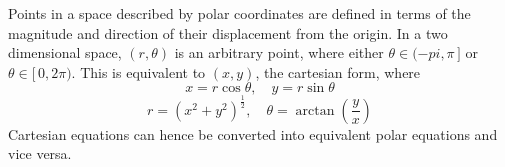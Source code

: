 \documentclass{article}
\begin{document}
\begin{multicols}{2}

    \begin{center}


    \end{center}

    \noindent Points in a space described by polar coordinates are defined in
    terms of the magnitude and direction of their displacement from the origin.
    In a two dimensional space, \(\left(r, \theta\right)\) is an arbitrary
    point, where either \(\theta \in (-pi, \pi\,]\) or \(\theta \in [\,0,
    2\pi)\). This is equivalent to \((x, y)\), the cartesian form, where \[x =
    r\cos\theta, \quad y = r\sin\theta\] \[r = \left(x^2 +
    y^2\right)^{\frac{1}{2}}, \quad \theta = \arctan\left(\frac{y}{x}\right)\]
    Cartesian equations can hence be converted into equivalent polar equations
    and vice versa. 

\end{multicols}
\end{document}
